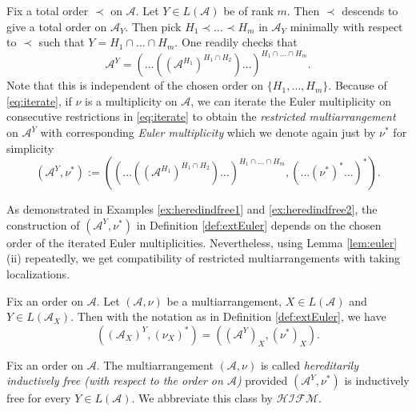 \begin{defn}
\label{def:extEuler}
Fix a total order $\prec$ on ${{\mathcal A}}$.
Let $Y\in L({{\mathcal A}})$ be of rank $m$.
Then $\prec$ descends to give a total order on ${{\mathcal A}}_Y$.
Then pick $H_1 \prec \ldots \prec H_m$ in ${{\mathcal A}}_Y$ 
minimally with respect to $\prec$ such that 
$Y = H_1 \cap \ldots \cap H_m$.
One readily checks that 
\begin{equation}
\label{eq:iterate}
{{\mathcal A}}^Y =
\left( \ldots \left(({{\mathcal A}}^{H_1} )^{H_1\cap H_2}\right) \ldots \right)^{H_1\cap \ldots \cap H_m}. 
\end{equation}
Note that 
this is independent of the chosen order on $\{H_1, \ldots, H_m\}$.
Because of \eqref{eq:iterate},
if $\nu$ is a multiplicity on ${{\mathcal A}}$, 
we can iterate the Euler multiplicity on 
consecutive restrictions in \eqref{eq:iterate} 
to obtain the \emph{restricted multiarrangement} on ${{\mathcal A}}^Y$
with corresponding \emph{Euler multiplicity} 
which we denote again just by $\nu^*$ for simplicity
\[
({{\mathcal A}}^Y, \nu^*) := 
\left(\left( \ldots \left(({{\mathcal A}}^{H_1} )^{H_1\cap H_2}\right) \ldots \right)^{H_1\cap \ldots \cap H_m} , \left( \ldots (\nu^*)^* \ldots \right)^*\right).
\]
\end{defn}

As demonstrated in 
Examples \ref{ex:heredindfree1} and \ref{ex:heredindfree2}, 
the construction of $({{\mathcal A}}^Y, \nu^*)$ in Definition \ref{def:extEuler}
depends on the chosen order of the iterated Euler multiplicities.
Nevertheless, using Lemma \ref{lem:euler}(ii) repeatedly, 
we get compatibility of 
restricted multiarrangements 
with taking localizations.

\begin{corollary}
\label{cor:extEuler}
Fix an order on ${{\mathcal A}}$.
Let $({{\mathcal A}}, \nu)$ be a multiarrangement, $X \in L({{\mathcal A}})$ and $Y \in L({{\mathcal A}}_X)$.
Then with the notation as in Definition \ref{def:extEuler}, 
we have 
\[
(({{\mathcal A}}_X)^Y, (\nu_X)^*) = (({{\mathcal A}}^Y)_X, (\nu^*)_X).
\]
\end{corollary}

\begin{defn}
\label{def:heredindfree}
Fix an order on ${{\mathcal A}}$.
The  multiarrangement $({{\mathcal A}}, \nu)$ is called 
\emph{hereditarily inductively free 
(with respect to the order on ${{\mathcal A}}$)} provided 
$({{\mathcal A}}^Y, \nu^*) $ is inductively free for every  
$Y\in L({{\mathcal A}})$. We abbreviate this class by 
${{\mathcal {HIFM}}}$.
\end{defn}


